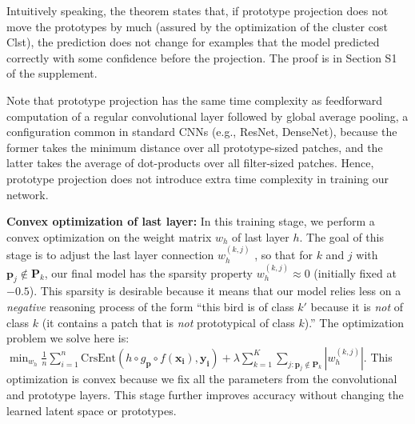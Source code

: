 \documentclass{article}
\theoremstyle{definition}
\theoremstyle{remark}
\begin{document}
Intuitively speaking, the theorem states that, if prototype projection does not move the prototypes by much (assured by the optimization of the cluster cost Clst), the prediction does not change for examples that the model predicted correctly with some confidence before the projection. The proof is in Section S1 of the supplement.

Note that prototype projection has the same time complexity as feedforward computation of a regular convolutional layer followed by global average pooling, a configuration common in standard CNNs (e.g., ResNet, DenseNet), because the former takes the minimum distance over all prototype-sized patches, and the latter takes the average of dot-products over all filter-sized patches. Hence, prototype projection does not introduce extra time complexity in training our network.

\textbf{Convex optimization of last layer:} In this training stage, we perform a convex optimization on the weight matrix $w_h$ of last layer $h$. The goal of this stage is to adjust the last layer connection $w_h^{(k, j)}$
, so that for $k$ and $j$ with $\mathbf{p}_j \not\in \mathbf{P}_k$, our final model has the sparsity property $w_h^{(k, j)} \approx 0$ (initially fixed at $-0.5$). This sparsity is desirable because it means that our model relies less on a \textit{negative} reasoning process of the form ``this bird is of class $k'$ because it is \textit{not} of class $k$ (it contains a patch that is \textit{not} prototypical of class $k$).''
The optimization problem we solve here is: $\min_{w_h} \frac{1}{n}\sum_{i=1}^n \textrm{CrsEnt}(h \circ g_{\mathbf{p}} \circ f(\mathbf{x_i}), \mathbf{y_i}) + \lambda\sum_{k=1}^{K} \sum_{j:\mathbf{p}_j \not\in \mathbf{P}_k} |w_h^{(k, j)}|$.
This optimization is convex because we fix all the parameters from the convolutional and prototype layers. This stage further improves accuracy without changing the learned latent space or prototypes.
\end{document}
